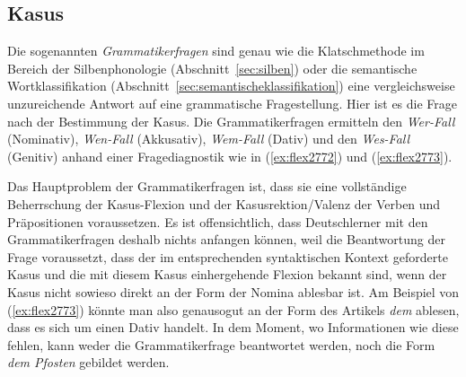 \subsection{Kasus}

\label{sec:kasus}


Die sogenannten \textit{Grammatikerfragen} sind genau wie die Klatschmethode im Bereich der Silbenphonologie (Abschnitt~\ref{sec:silben}) oder die semantische Wortklassifikation (Abschnitt~\ref{sec:semantischeklassifikation}) eine vergleichsweise unzureichende Antwort auf eine grammatische Fragestellung.
Hier ist es die Frage nach der Bestimmung der Kasus.
Die Grammatikerfragen ermitteln den \textit{Wer-Fall} (Nominativ), \textit{Wen-Fall} (Akkusativ), \textit{Wem-Fall} (Dativ) und den \textit{Wes-Fall} (Genitiv) anhand einer Fragediagnostik wie in (\ref{ex:flex2772}) und (\ref{ex:flex2773}).

\begin{exe}
  \ex \label{ex:flex2772}
  \begin{xlist}
  \end{xlist}
  \ex \label{ex:flex2773}
  \begin{xlist}
  \end{xlist}
\end{exe}

Das Hauptproblem der Grammatikerfragen ist, dass sie eine vollständige Beherrschung der Kasus-Flexion und der Kasusrektion\slash Valenz der Verben und Präpositionen voraussetzen.
Es ist offensichtlich, dass \zB Deutschlerner mit den Grammatikerfragen deshalb nichts anfangen können, weil die Beantwortung der Frage voraussetzt, dass der im entsprechenden syntaktischen Kontext geforderte Kasus und die mit diesem Kasus einhergehende Flexion bekannt sind, wenn der Kasus nicht sowieso direkt an der Form der Nomina ablesbar ist.
Am Beispiel von (\ref{ex:flex2773}) könnte man also genausogut an der Form des Artikels \textit{dem} ablesen, dass es sich um einen Dativ handelt.
In dem Moment, wo Informationen wie diese fehlen, kann weder die Grammatikerfrage beantwortet werden, noch die Form \textit{dem Pfosten} gebildet werden.


